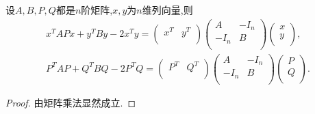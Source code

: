 \documentclass[../../main.tex]{subfiles}%
\begin{document}
\begin{lemma}\label{lemma:矩阵二次型技巧}
设$A,B,P,Q$都是$n$阶矩阵,$x,y$为$n$维列向量,则
\begin{gather*}
x^TAPx+y^TBy-2x^Ty=\left( \begin{matrix}
x^T&		y^T\\
\end{matrix} \right) \left( \begin{matrix}
A&		-I_n\\
-I_n&		B\\
\end{matrix} \right) \left( \begin{array}{c}
x\\
y\\
\end{array} \right) ,
\\
P^TAP+Q^TBQ-2P^TQ=\left( \begin{matrix}
P^T&		Q^T\\
\end{matrix} \right) \left( \begin{matrix}
A&		-I_n\\
-I_n&		B\\
\end{matrix} \right) \left( \begin{array}{c}
P\\
Q\\
\end{array} \right) .
\end{gather*}
\end{lemma}
\begin{proof}
由矩阵乘法显然成立.
\end{proof}
\end{document}
